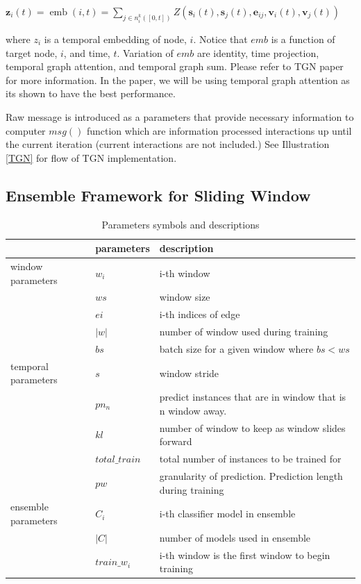 \documentclass{IEEEtran}
\begin{document}
\(\mathbf{z}_{i}(t)=\operatorname{emb}(i, t)=\sum_{j \in n_{i}^{k}([0, t])} Z\left(\mathbf{s}_{i}(t), \mathbf{s}_{j}(t), \mathbf{e}_{i j}, \mathbf{v}_{i}(t), \mathbf{v}_{j}(t)\right)\)

where \(z_{i}\) is a temporal embedding of node, \(i\). Notice that \(emb\) is a function of target node, \(i\), and time, \(t\). Variation of \(emb\) are identity, time projection, temporal graph attention, and temporal graph sum. Please refer to TGN paper \cite{rossi2020temporal} for more information. In the paper, we will be using temporal graph attention as its shown to have the best performance.

Raw message is introduced as a parameters that provide necessary information to computer \(msg()\) function which are information processed interactions up until the current iteration (current interactions are not included.) See Illustration \ref{TGN} for flow of TGN implementation.
\subsection{Ensemble Framework for Sliding Window}
\label{sec:orgd416f33}
\begin{table}[htbp]
\caption{\label{parameters}Parameters symbols and descriptions}
\centering
\begin{tabular}{lll}
\hline
\hline
 & parameters & description\\
\hline
window parameters & \(w_i\) & i-th window\\
 & \(ws\) & window size\\
 & \(ei\) & i-th indices of edge\\
 & \(\vert w \vert\) & number of window used during training\\
 & \(bs\) & batch size for a given window where \(bs < ws\)\\
temporal parameters & \(s\) & window stride\\
 & \(pn_{n}\) & predict instances that are in window that is n window away.\\
 & \(kl\) & number of window to keep as window slides forward\\
 & \(total\_train\) & total number of instances to be trained for\\
 & \(pw\) & granularity of prediction. Prediction length during training\\
ensemble parameters & \(C_{i}\) & i-th classifier model in ensemble\\
 & \(\vert C \vert\) & number of models used in ensemble\\
 & \(train\_w_{i}\) & i-th window is the first window to begin training\\
\end{tabular}
\end{table}
\end{document}
